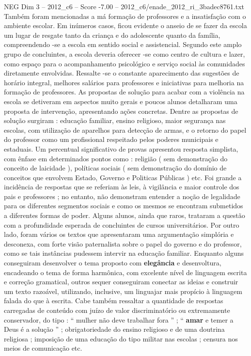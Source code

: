 \begin{textsample}{NEG Dim 3 – 2012\_c6 – Score -7.00 – 2012\_c6/enade\_2012\_ri\_3badec8761.txt}
Também foram mencionadas a má formação de professores e a insatisfação com o ambiente escolar.
Em inúmeros casos, ficou evidente o anseio de se fazer da escola um lugar de resgate tanto da criança e do adolescente quanto da família, compreendendo -se a escola em sentido social e assistencial.
Segundo este amplo grupo de concluintes, a escola deveria oferecer -se como centro de cultura e lazer, como espaço para o acompanhamento psicológico e serviço social às comunidades diretamente envolvidas.
Ressalte -se o constante aparecimento das sugestões de horário integral, melhores salários para professores e iniciativas para melhoria na formação de professores.
As propostas de solução para acabar com a violência na escola se detiveram em aspectos muito gerais e poucos alunos detalharam uma proposta de intervenção, apresentando ações concretas.
Dentre as propostas de solução surgiram : educação familiar, ensino religioso, maior segurança nas escolas, com utilização de aparelhos para detecção de armas, e o retorno do papel do professor como um profissional respeitado pelos poderes municipais e estaduais.
Um percentual significativo de provas apresentou resposta simplista, com ênfase em determinados pontos como : religião ( sem demonstração do conceito de laicidade ), políticas sociais ( sem demonstração do domínio de conceitos que envolvem Estado, Governo e Politicas Públicas ) etc.
Foi grande a incidência de respostas que se referiam às leis, à vigilância e maior controle dos pais e professores ; no entanto, não demonstram entender a noção de legalidade para os diferentes segmentos sociais e como os mesmos se encontram submetidos a diferentes formas de poder.
Alguns alunos, ainda que raros, trataram a questão com a profundidade esperada de concluintes de cursos universitários.
Por outro lado, foram vários os textos que apresentaram uma argumentação simplória e desconexa, com forte visão paternalista sobre o papel do governo e do professor, como se tais instâncias pudessem intervir na educação familiar.
Enquanto alguns conseguiram desenvolver o tema proposto com \textbf{elegância} e desenvoltura, encadeando o tema de forma harmônica, com excelente nível de linguagem escrita e correção gramatical, outros sequer conseguiram conectar as ideias e construir um texto razoável, utilizando, inclusive, um linguajar mais propício à linguagem falada do que à escrita.
Cabe também ressaltar a quantidade de respostas carregadas de conteúdo com juízo de valor discriminatório ou extremamente conservador, do tipo : “ mulher não deve trabalhar fora ” ; “ \textbf{amar} e temer a Deus é a solução ” ; obrigatoriedade do ensino religioso e de uma doutrina religiosa ; imposição de uma educação do tipo militar nas escolas ; censura nos meios de comunicação etc.

\end{textsample}
